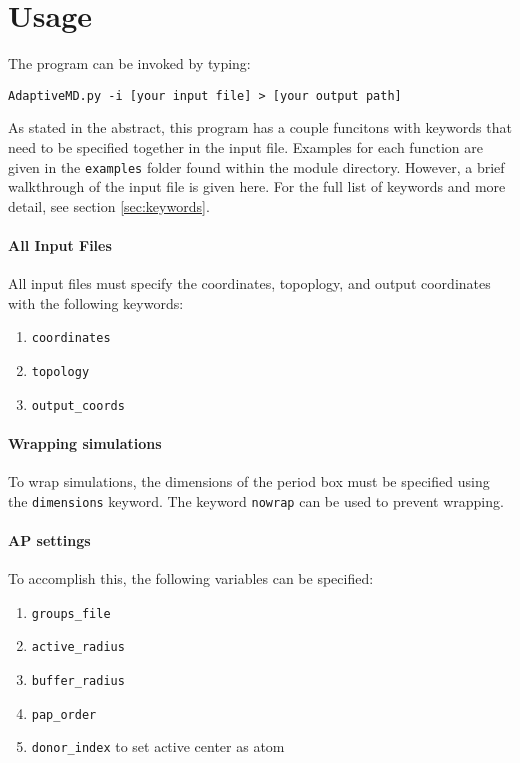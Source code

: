 \documentclass{article}
\begin{document}
\section{Usage}
The program can be invoked by typing:

\texttt{AdaptiveMD.py -i [your input file] > [your output path]}

As stated in the abstract, this program has a couple funcitons with keywords that need to be specified together in the input file.
Examples for each function are given in the \texttt{examples} folder found within the module directory.
However, a brief walkthrough of the input file is given here.
For the full list of keywords and more detail, see section \ref{sec:keywords}.

\paragraph{All Input Files}
All input files must specify the coordinates, topoplogy, and output coordinates with the following keywords:

\begin{enumerate}
	\item \texttt{coordinates}
	\item \texttt{topology}
	\item \texttt{output\_coords}
\end{enumerate}


\paragraph{Wrapping simulations}
To wrap simulations, the dimensions of the period box must be specified using the \texttt{dimensions} keyword. The keyword \texttt{nowrap} can be used to prevent wrapping.

\paragraph{AP settings}
To accomplish this, the following variables can be specified:
\begin{enumerate}
	\item \texttt{groups\_file}
	\item \texttt{active\_radius}
	\item \texttt{buffer\_radius}
	\item \texttt{pap\_order}
	\item \texttt{donor\_index} to set active center as atom	
\end{enumerate}
\end{document}
